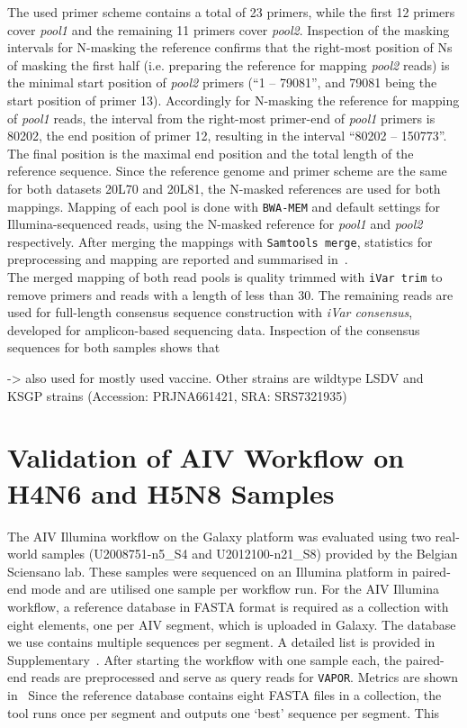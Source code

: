 The used primer scheme contains a total of 23 primers, while the first 12 primers cover \textit{pool1} and the remaining 11 primers cover \textit{pool2}. Inspection of the masking intervals for N-masking the reference confirms that the right-most position of Ns of masking the first half (i.e. preparing the reference for mapping \textit{pool2} reads) is the minimal start position of \textit{pool2} primers (``1 -- 79081'', and 79081 being the start position of primer 13). Accordingly for N-masking the reference for mapping of \textit{pool1} reads, the interval from the right-most primer-end of \textit{pool1} primers is 80202, the end position of primer 12, resulting in the interval ``80202 -- 150773''. The final position is the maximal end position and the total length of the reference sequence. Since the reference genome and primer scheme are the same for both datasets 20L70 and 20L81, the N-masked references are used for both mappings. Mapping of each pool is done with \texttt{BWA-MEM} and default settings for Illumina-sequenced reads, using the N-masked reference for \textit{pool1} and \textit{pool2} respectively. After merging the mappings with \texttt{Samtools merge}, statistics for preprocessing and mapping are reported and summarised in~. \\
The merged mapping of both read pools is quality trimmed with \texttt{iVar trim} to remove primers and reads with a length of less than 30. The remaining reads are used for full-length consensus sequence construction with \textit{iVar consensus}, developed for amplicon-based sequencing data. Inspection of the consensus sequences for both samples shows that 


-> also used for mostly used vaccine. Other strains are wildtype LSDV and KSGP strains (Accession: PRJNA661421, SRA: SRS7321935)


\section{Validation of AIV Workflow on H4N6 and H5N8 Samples}\label{sec:4-aiv}
The \ac{AIV} Illumina workflow on the Galaxy platform was evaluated using two real-world samples (U2008751-n5\_S4 and U2012100-n21\_S8) provided by the Belgian Sciensano lab. These samples were sequenced on an Illumina platform in paired-end mode and are utilised one sample per workflow run.  For the \ac{AIV} Illumina workflow, a reference database in FASTA format is required as a collection with eight elements, one per \ac{AIV} segment, which is uploaded in Galaxy. The database we use contains multiple sequences per segment. A detailed list is provided in Supplementary~.
After starting the workflow with one sample each, the paired-end reads are preprocessed and serve as query reads for \texttt{VAPOR}. Metrics are shown in~ Since the reference database contains eight FASTA files in a collection, the tool runs once per segment and outputs one `best' sequence per segment. This

